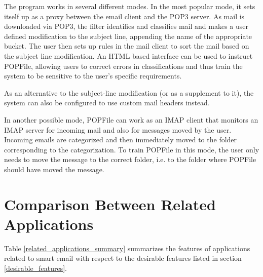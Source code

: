 The program works in several different modes. In the most popular mode, it sets 
itself up as a proxy between the email client and the POP3 server. As mail is 
downloaded via POP3, the filter identifies and classifies mail and makes a user 
defined modification to the subject line, appending the name of the appropriate 
bucket. The user then sets up rules in the mail client to sort the mail based 
on the subject line modification. An HTML based interface can be used to instruct 
POPFile, allowing users to correct errors in classifications and thus train the 
system to be sensitive to the user's specific requirements.

As an alternative to the subject-line modification (or as a supplement to it), 
the system can also be configured to use custom mail headers instead.

In another possible mode, POPFile can work as an IMAP client that monitors an 
IMAP server for incoming mail and also for messages moved by the user. Incoming 
emails are categorized and then immediately moved to the folder corresponding 
to the categorization. To train POPFile in this mode, the user only needs to 
move the message to the correct folder, i.e. to the folder where POPFile should 
have moved the message.

\section{Comparison Between Related Applications}
\label{comparison_sec}
Table \ref{related_applications_summary} summarizes the features of applications related to smart email with respect to the desirable features listed in section \ref{desirable_features}.

